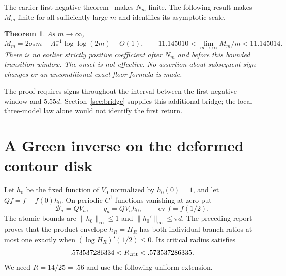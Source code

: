 \documentclass[11pt,a4paper]{article}
\newtheorem{theorem}{Theorem}[section]\newtheorem{lemma}[theorem]{Lemma}
\newcommand{\ev}{\operatorname{ev}}\newcommand{\GG}{\mathcal G}
\begin{document}
The earlier first-negative theorem~\cite{First} makes $N_m$ finite. The following result makes $M_m$ finite for all sufficiently large $m$ and identifies its asymptotic scale.
\begin{theorem}\label{thm:return}
As $m\to\infty$,
\[
 M_m=2\sigma_*m-\Lambda_*^{-1}\log\log(2m)+O(1),
 \qquad 11.145010<\lim_{m\to\infty}M_m/m<11.145014.
\]
There is no earlier strictly positive coefficient after $N_m$ and before this bounded transition window. The onset is not effective. No assertion about subsequent sign changes or an unconditional exact floor formula is made.
\end{theorem}
The proof requires signs throughout the interval between the first-negative window and $5.55d$. Section~\ref{sec:bridge} supplies this additional bridge; the local three-model law alone would not identify the first return.

\section{A Green inverse on the deformed contour disk}
Let $h_0$ be the fixed function of $V_0$ normalized by $h_0(0)=1$, and let $Qf=f-f(0)h_0$. On periodic $C^1$ functions vanishing at zero put
\[
 \mathcal B_a=QV_a,\qquad q_a=QV_ah_0,\qquad \ev f=f(1/2).
\]
The atomic bounds are $\|h_0\|_\infty\le1$ and $\|h_0'\|_\infty\le\pi d$.
The preceding report proves that the product envelope $h_R=H_R$ has both individual branch ratios at most one exactly when
$(\log H_R)'(1/2)\le0$. Its critical radius satisfies
\[
 .573537286334<R_{\rm crit}<.573537286335.
\]
We need $R=14/25=.56$ and use the following uniform extension.
\end{document}
